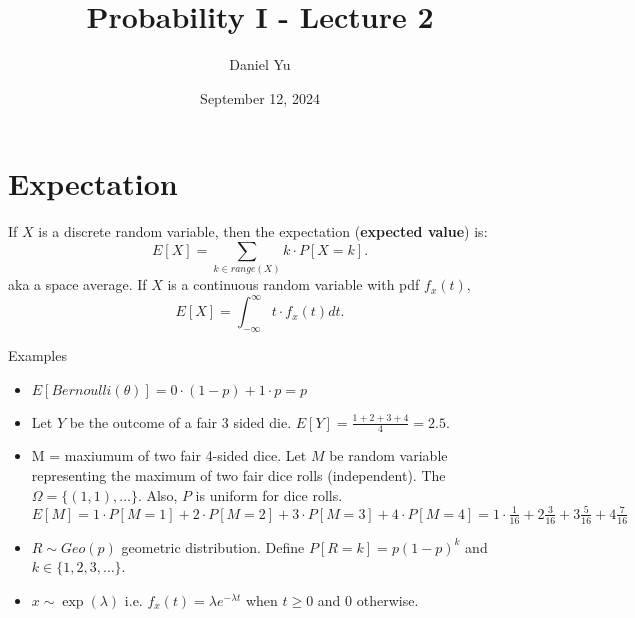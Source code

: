\documentclass[a4paper]{article}
\title{\Huge{Probability I - Lecture 2}}
\author{\huge{Daniel Yu}}
\date{September 12, 2024}
\begin{document}
\maketitle
\newpage%
\tableofcontents
\pagebreak

\section{Expectation}
\begin{definition}
  If $X$ is a discrete random variable, then the expectation (\textbf{expected value}) is:
  \[
    E[X] = \sum_{k \in range(X)} k \cdot P[X=k]
  .\]
  aka a space average. If $X$ is a continuous random variable with pdf $f_x\left(t \right)$,
  \[
    E[X] = \int_{-\infty}^\infty t \cdot f_x(t) dt
  .\] 
\end{definition}

\begin{remark}{Examples}\\
  \begin{itemize}
    \item $E[Bernoulli(\theta)] = 0 \cdot (1-p) + 1 \cdot p = p$
    \item Let $Y$ be the outcome of a fair 3 sided die. $E[Y] = \frac{1+2+3+4}{4} = 2.5$. 
    \item M = maxiumum of two fair 4-sided dice. Let $M$ be random variable representing the maximum of two fair
      dice rolls (independent). The $\Omega= \{(1,1), \ldots \}$. Also, $P$ is uniform for dice rolls. $E[M]= 1 \cdot P[M=1] + 2 \cdot P[M=2] + 3 \cdot P[M=3] + 4 \cdot P[M=4] = 1 \cdot \frac{1}{16} +
      2 \frac{3}{16} + 3 \frac{5}{16} + 4 \frac{7}{16}$
    \item $R \sim Geo(p)$ geometric distribution. Define $P[R=k]= p(1-p)^{k}$ and $k \in \{1,2,3, \ldots\} $. 
    \item $x \sim \exp(\lambda)$ i.e. $f_x(t) = \lambda e^{-\lambda t}$ when $t \geq 0$ and $0$ otherwise. 
  \end{itemize}
\end{remark}
\end{document}
